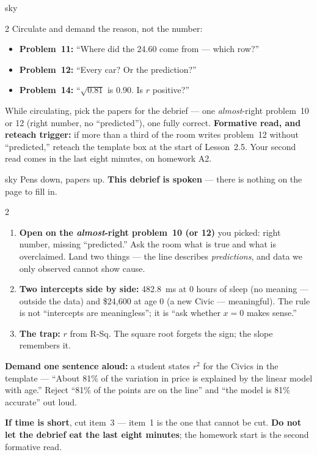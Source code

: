 \documentclass[10pt]{article}
\begin{document}
\begin{skillbox}{sky}
\begin{multicols}{2}
Circulate and demand the reason, not the number:
\begin{itemize}[leftmargin=1.1em, nosep]
  \item \textbf{Problem~11:} ``Where did the 24.60 come from --- which row?''
  \item \textbf{Problem~12:} ``Every car? Or the prediction?''
  \item \textbf{Problem~14:} ``$\sqrt{0.81}$ is 0.90. Is $r$ positive?''
\end{itemize}
While circulating, pick the papers for the debrief --- one \emph{almost}-right problem~10 or 12
(right number, no ``predicted''), one fully correct. \textbf{Formative read, and reteach
trigger:} if more than a third of the room writes problem~12 without ``predicted,'' reteach the
template box at the start of Lesson~2.5. Your second read comes in the last eight minutes, on
homework A2.
\end{multicols}
\end{skillbox}

\boxguard
\begin{skillbox}{sky}
Pens down, papers up. \textbf{This debrief is spoken} --- there is nothing on the page to fill in.
\begin{multicols}{2}
\begin{enumerate}[leftmargin=1.3em, nosep, itemsep=3pt]
  \item \textbf{Open on the \emph{almost}-right problem~10 (or 12)} you picked: right number,
        missing ``predicted.'' Ask the room what is true and what is overclaimed. Land two
        things --- the line describes \emph{predictions}, and data we only observed cannot show
        cause.
  \item \textbf{Two intercepts side by side:} 482.8~ms at 0 hours of sleep (no meaning ---
        outside the data) and \$24{,}600 at age 0 (a new Civic --- meaningful). The rule is
        not ``intercepts are meaningless''; it is ``ask whether $x = 0$ makes sense.''
  \item \textbf{The trap:} $r$ from R-Sq. The square root forgets the sign; the slope remembers
        it.
\end{enumerate}
\columnbreak
\textbf{Demand one sentence aloud:} a student states $r^2$ for the Civics in the template ---
``About 81\% of the variation in price is explained by the linear model with age.'' Reject
``81\% of the points are on the line'' and ``the model is 81\% accurate'' out loud.

\textbf{If time is short}, cut item~3 --- item~1 is the one that cannot be cut. \textbf{Do not
let the debrief eat the last eight minutes}; the homework start is the second formative read.
\end{multicols}
\end{skillbox}
\end{document}
